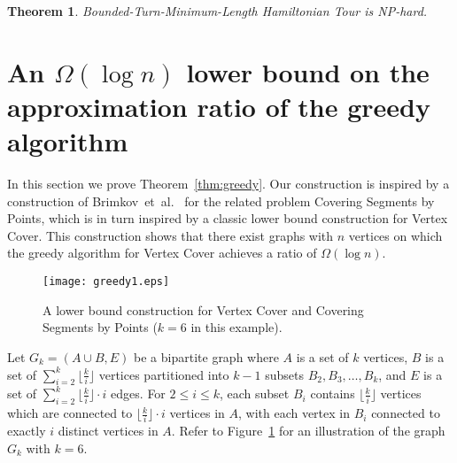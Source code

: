 \documentclass[letterpaper,11pt]{article}
\newtheorem{theorem}{Theorem}
\def\etal{{et~al.}}
\begin{document}
\begin{theorem}\label{thm:hamiltonian2}
{\sc Bounded-Turn-Minimum-Length Hamiltonian Tour} is NP-hard.
\end{theorem}


\section{An $\Omega(\log n)$ lower bound on the approximation ratio of
  the greedy algorithm} 

In this section we prove Theorem~\ref{thm:greedy}.
Our construction is inspired by a construction of Brimkov~\etal~\cite{BLWM12}
for the related problem {\sc Covering Segments by Points},
which is in turn inspired by a classic lower bound construction for {\sc Vertex Cover}.
This construction shows that there exist graphs with $n$ vertices 
on which the greedy algorithm for {\sc Vertex Cover} achieves
a ratio of $\Omega(\log {n})$. 
\begin{figure}[htb]
\centering\texttt{[image: greedy1.eps]}
\caption{A lower bound construction for {\sc Vertex Cover} and 
{\sc Covering Segments by Points} 
($k=6$ in this example).}
\label{fig:greedy1}
\end{figure}

Let $G_k = (A\cup B, E)$ be a bipartite graph
where $A$ is a set of $k$ vertices,
$B$ is a set of $\sum_{i=2}^k \lfloor \frac{k}{i} \rfloor$ vertices
partitioned into $k-1$ subsets $B_2, B_3, \ldots, B_k$,
and $E$ is a set of $\sum_{i=2}^k \lfloor \frac{k}{i} \rfloor \cdot i$ edges.
For $2 \le i \le k$,
each subset $B_i$ contains $\lfloor \frac{k}{i} \rfloor$ vertices
which are connected to $\lfloor \frac{k}{i} \rfloor \cdot i$ vertices in $A$,
with each vertex in $B_i$ connected to exactly $i$ distinct vertices in $A$.
Refer to Figure~\ref{fig:greedy1} for an illustration of the graph $G_k$ with
$k=6$.
\end{document}

